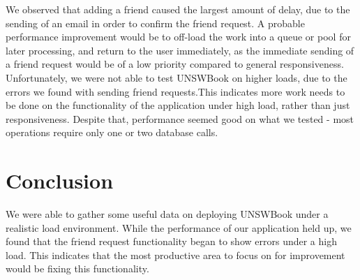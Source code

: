 \documentclass[11pt]{report}
\begin{document}
We observed that adding a friend caused the largest amount of delay, due to the sending of an email in order to confirm the friend request. A probable performance improvement would be to off-load the work into a queue or pool for later processing, and return to the user immediately, as the immediate sending of a friend request would be of a low priority compared to general responsiveness. \\


Unfortunately, we were not able to test UNSWBook on higher loads, due to the errors we found with sending friend requests.This indicates more work needs to be done on the functionality of the application under high load, rather than just responsiveness. Despite that, performance seemed good on what we tested - most operations require only one or two database calls. 

\chapter{Conclusion}
We were able to gather some useful data on deploying UNSWBook under a realistic load environment. While the performance of our application held up, we found that the friend request functionality began to show errors under a high load. This indicates that the most productive area to focus on for improvement would be fixing this functionality. 
\end{document}
